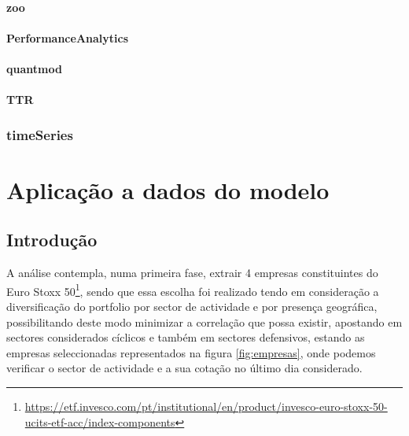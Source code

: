 \documentclass[
  12pt,
  a4paper,
  openany]{book}
\begin{document}
\hypertarget{zoo}{%
\subsubsection{zoo}\label{zoo}}

\hypertarget{performanceanalytics-1}{%
\subsubsection{PerformanceAnalytics}\label{performanceanalytics-1}}

\hypertarget{quantmod}{%
\subsubsection{quantmod}\label{quantmod}}

\hypertarget{ttr}{%
\subsubsection{TTR}\label{ttr}}

\hypertarget{timeseries}{%
\subsection{timeSeries}\label{timeseries}}

\hypertarget{aplicauxe7uxe3o-a-dados-do-modelo}{%
\chapter{Aplicação a dados do modelo}\label{aplicauxe7uxe3o-a-dados-do-modelo}}

\newpage

\hypertarget{introduuxe7uxe3o-1}{%
\section{Introdução}\label{introduuxe7uxe3o-1}}

A análise contempla, numa primeira fase, extrair 4 empresas constituintes do Euro Stoxx 50\footnote{\url{https://etf.invesco.com/pt/institutional/en/product/invesco-euro-stoxx-50-ucits-etf-acc/index-components}}, sendo que essa escolha foi realizado tendo em consideração a diversificação do portfolio por sector de actividade e por presença geográfica, possibilitando deste modo minimizar a correlação que possa existir, apostando em sectores considerados cíclicos e também em sectores defensivos, estando as empresas seleccionadas representados na figura \ref{fig:empresas}, onde podemos verificar o sector de actividade e a sua cotação no último dia considerado.
\end{document}
